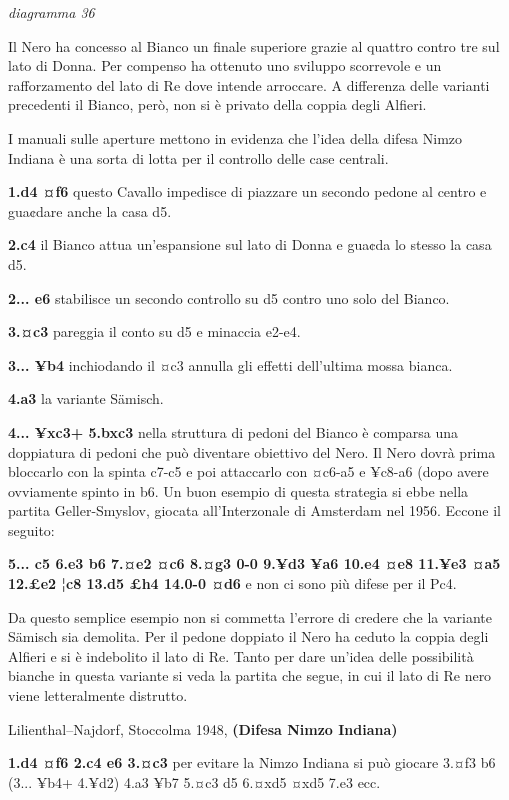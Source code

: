 \documentclass[
]{article}
\begin{document}
\emph{diagramma 36}

Il Nero ha concesso al Bianco un finale superiore grazie al quattro
contro tre sul lato di Donna. Per compenso ha ottenuto uno sviluppo
scorrevole e un rafforzamento del lato di Re dove intende arroccare. A
differenza delle varianti precedenti il Bianco, però, non si è privato
della coppia degli Alfieri.

I manuali sulle aperture mettono in evidenza che l'idea della difesa
Nimzo Indiana è una sorta di lotta per il controllo delle case centrali.

\textbf{1.d4 ¤f6} questo Cavallo impedisce di piazzare un secondo pedone
al centro e gua¢dare anche la casa d5.

\textbf{2.c4} il Bianco attua un'espansione sul lato di Donna e gua¢da
lo stesso la casa d5.

\textbf{2... e6} stabilisce un secondo controllo su d5 contro uno solo
del Bianco.

\textbf{3.¤c3} pareggia il conto su d5 e minaccia e2-e4.

\textbf{3... ¥b4} inchiodando il ¤c3 annulla gli effetti dell'ultima
mossa bianca.

\textbf{4.a3} la variante Sämisch.

\textbf{4... ¥xc3+ 5.bxc3} nella struttura di pedoni del Bianco è
comparsa una doppiatura di pedoni che può diventare obiettivo del Nero.
Il Nero dovrà prima bloccarlo con la spinta c7-c5 e poi attaccarlo con
¤c6-a5 e ¥c8-a6 (dopo avere ovviamente spinto in b6. Un buon esempio di
questa strategia si ebbe nella partita Geller-Smyslov, giocata
all'Interzonale di Amsterdam nel 1956. Eccone il seguito:

\textbf{5... c5 6.e3 b6 7.¤e2 ¤c6 8.¤g3 0-0 9.¥d3 ¥a6 10.e4 ¤e8 11.¥e3
¤a5 12.£e2 ¦c8 13.d5 £h4 14.0-0 ¤d6} e non ci sono più difese per il
Pc4.

Da questo semplice esempio non si commetta l'errore di credere che la
variante Sämisch sia demolita. Per il pedone doppiato il Nero ha ceduto
la coppia degli Alfieri e si è indebolito il lato di Re. Tanto per dare
un'idea delle possibilità bianche in questa variante si veda la partita
che segue, in cui il lato di Re nero viene letteralmente distrutto.

Lilienthal--Najdorf, Stoccolma 1948, \textbf{(Difesa Nimzo Indiana)}

\textbf{1.d4 ¤f6 2.c4 e6 3.¤c3} per evitare la Nimzo Indiana si può
giocare 3.¤f3 b6 (3... ¥b4+ 4.¥d2) 4.a3 ¥b7 5.¤c3 d5 6.¤xd5 ¤xd5 7.e3
ecc.
\end{document}
